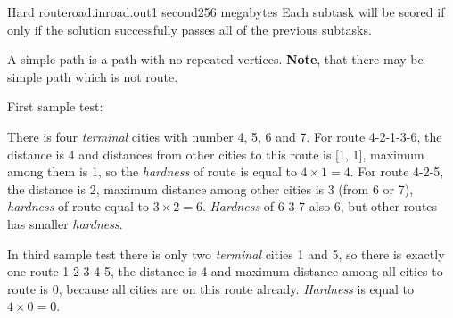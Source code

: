 \begin{problem}{Hard route}{road.in}{road.out}{1 second}{256 megabytes}
Each subtask will be scored if only if the solution successfully passes all of the previous subtasks.

\Examples

\begin{example}
%
%
%
\end{example}

\Note
A simple path is a path with no repeated vertices. \textbf{Note}, that there may be simple path which is not route.

First sample test:

There is four \textit{terminal} cities with number 4, 5, 6 and 7. For route 4-2-1-3-6, the distance is 4 and distances from other cities to this route is [1, 1], maximum among them is 1, so the \textit{hardness} of route is equal to $4 \times 1 = 4$. For route 4-2-5, the distance is 2, maximum distance among other cities is 3 (from 6 or 7), \textit{hardness} of route equal to $3 \times 2 = 6$. \textit{Hardness} of 6-3-7 also 6, but other routes has smaller \textit{hardness}.

In third sample test there is only two \textit{terminal} cities 1 and 5, so there is exactly one route 1-2-3-4-5, the distance is 4 and maximum distance among all cities to route is 0, because all cities are on this route already. \textit{Hardness} is equal to $4 \times 0 = 0$.

\end{problem}

